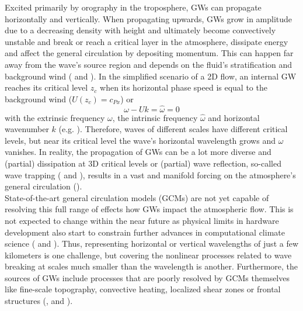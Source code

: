 Excited primarily by orography in the troposphere, GWs can propagate horizontally and vertically. When propagating upwards, GWs grow in amplitude due to a decreasing density with height and ultimately become convectively unstable and break or reach a critical layer in the atmosphere, dissipate energy and affect the general circulation by depositing momentum. This can happen far away from the wave's source region and depends on the fluid's stratification and background wind (\cite{teixeira_physics_2014} and \cite{eliassen_transfer_1960}). In the simplified scenario of a 2D flow, an internal GW reaches its critical level $z_c$ when its horizontal phase speed is equal to the background wind ($U(z_c)=c_{Px}$) or 
\begin{equation}
    \omega - U k = \hat{\omega} = 0
    \label{equ:critical_level_2D}
\end{equation}
with the extrinsic frequency $\omega$, the intrinsic frequency $\hat{\omega}$ and horizontal wavenumber $k$ (e.g. \cite[]{lin_mesoscale_2007}). Therefore, waves of different scales have different critical levels, but near its critical level the wave's horizontal wavelength grows and $\hat{\omega}$ vanishes. In reality, the propagation of GWs can be a lot more diverse and (partial) dissipation at 3D critical levels or (partial) wave reflection, so-called wave trapping (\cite{fritts_gravity_2018} and \cite{scorer_theory_1949}), results in a vast and manifold forcing on the atmosphere's general circulation (\cite{alexander_recent_2010}). \\
State-of-the-art general circulation models (GCMs) are not yet capable of resolving this full range of effects how GWs impact the atmospheric flow. This is not expected to change within the near future as physical limits in hardware development also start to constrain further advances in computational climate science (\cite{balaji_climbing_2021} and \cite{balaji_climate_2015}). Thus, representing horizontal or vertical wavelengths of just a few kilometers is one challenge, but covering the nonlinear processes related to wave breaking at scales much smaller than the wavelength is another. Furthermore, the sources of GWs include processes that are poorly resolved by GCMs themselves like fine-scale topography, convective heating, localized shear zones or frontal structures (\cite{medvedev_gravity_2019}, \cite{fritts_gravity_2003} and \cite{plougonven_internal_2014}). \\
